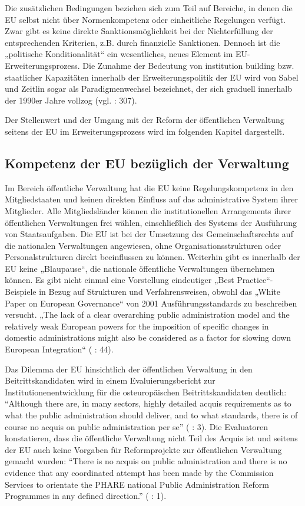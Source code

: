 Die zusätzlichen Bedingungen beziehen sich zum Teil auf Bereiche, in denen die EU selbst nicht über Normenkompetenz oder einheitliche Regelungen verfügt. Zwar gibt es keine direkte Sanktionsmöglichkeit bei der Nichterfüllung der entsprechenden Kriterien, z.B. durch finanzielle Sanktionen. Dennoch ist die „politische Konditionalität“ ein wesentliches, neues Element im EU-Erweiterungsprozess. Die Zunahme der Bedeutung von institution building bzw. staatlicher Kapazitäten innerhalb der Erweiterungspolitik der EU wird von Sabel und Zeitlin sogar als Paradigmenwechsel bezeichnet, der sich graduell innerhalb der 1990er Jahre vollzog (vgl.\cite{sabzei} : 307).\par
Der Stellenwert und der Umgang mit der Reform der öffentlichen Verwaltung seitens der EU im Erweiterungsprozess wird im folgenden Kapitel dargestellt.

\subsection{Kompetenz der EU bezüglich der Verwaltung}
\label{subsec:Kompetenz der EU}
Im Bereich öffentliche Verwaltung hat die EU keine Regelungskompetenz in den Mitgliedstaaten und keinen direkten Einfluss auf das administrative System ihrer Mitglieder. Alle Mitgliedsländer können die institutionellen Arrangements ihrer öffentlichen Verwaltungen frei wählen, einschließlich des Systems der Ausführung von Staatsaufgaben. Die EU ist bei der Umsetzung des Gemeinschaftsrechts auf die nationalen Verwaltungen angewiesen, ohne Organisationsstrukturen oder Personalstrukturen direkt beeinflussen zu können. Weiterhin gibt es innerhalb der EU keine „Blaupause“, die nationale öffentliche Verwaltungen übernehmen können. Es gibt nicht einmal eine Vorstellung eindeutiger „Best Practice“-Beispiele in Bezug auf Strukturen und Verfahrensweisen, obwohl das „White Paper on European Governance“ von 2001 Ausführungsstandards zu beschreiben versucht. „The lack of a clear overarching public administration model and the relatively weak European powers for the imposition of specific changes in domestic administrations might also be considered as a factor for slowing down European Integration“ (\cite{sverdrup} : 44).\par

Das Dilemma der EU hinsichtlich der öffentlichen Verwaltung in den Beitrittskandidaten wird in einem Evaluierungsbericht zur Institutionenentwicklung für die osteuropäischen Beitrittskandidaten deutlich: “Although there are, in many sectors, highly detailed acquis requirements as to what the public administration should deliver, and to what standards, there is of course no acquis on public administration per se” (\cite{omas} : 3). Die Evaluatoren konstatieren, dass die öffentliche Verwaltung nicht Teil des Acquis ist und seitens der EU auch keine Vorgaben für Reformprojekte zur öffentlichen Verwaltung gemacht wurden: “There is no acquis on public administration and there is no evidence that any coordinated attempt has been made by the Commission Services to orientate the PHARE national Public Administration Reform Programmes in any defined direction.” (\cite{omas} : 1). \par

